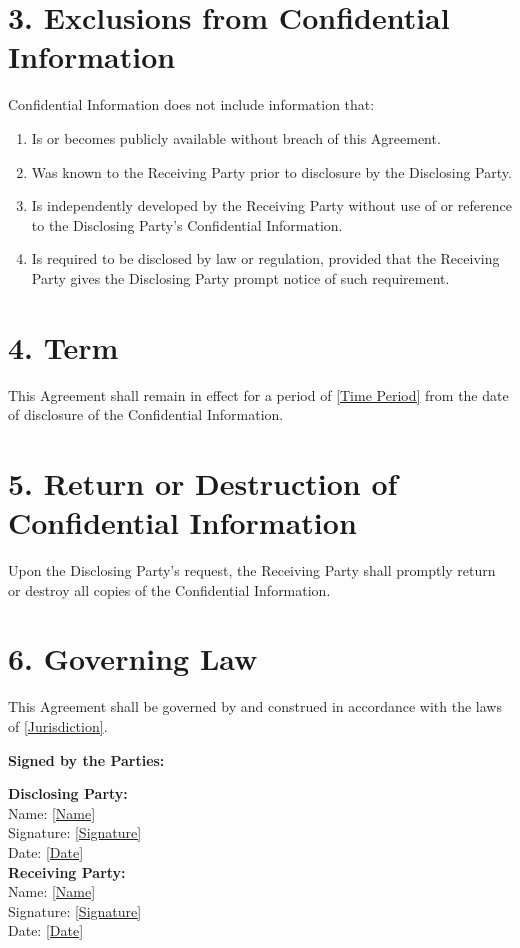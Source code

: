 \documentclass[12pt]{article}
\begin{document}
\section*{3. Exclusions from Confidential Information}
Confidential Information does not include information that:
\begin{enumerate}
    \item Is or becomes publicly available without breach of this Agreement.
    \item Was known to the Receiving Party prior to disclosure by the Disclosing Party.
    \item Is independently developed by the Receiving Party without use of or reference to the Disclosing Party's Confidential Information.
    \item Is required to be disclosed by law or regulation, provided that the Receiving Party gives the Disclosing Party prompt notice of such requirement.
\end{enumerate}

\section*{4. Term}
This Agreement shall remain in effect for a period of \underline{[Time Period]} from the date of disclosure of the Confidential Information.

\section*{5. Return or Destruction of Confidential Information}
Upon the Disclosing Party's request, the Receiving Party shall promptly return or destroy all copies of the Confidential Information.

\section*{6. Governing Law}
This Agreement shall be governed by and construed in accordance with the laws of \underline{[Jurisdiction]}.

\vspace{1cm}
\noindent \textbf{Signed by the Parties:}

\vspace{1cm}
\noindent \textbf{Disclosing Party:} \\
Name: \underline{[Name]} \\
Signature: \underline{[Signature]} \\
Date: \underline{[Date]} \\

\vspace{1cm}
\noindent \textbf{Receiving Party:} \\
Name: \underline{[Name]} \\
Signature: \underline{[Signature]} \\
Date: \underline{[Date]} \\
\end{document}
